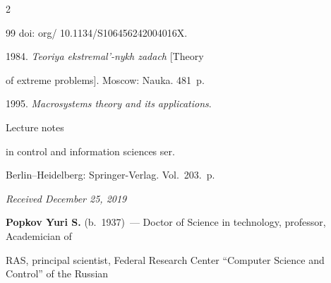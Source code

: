 \begin{multicols}{2}
{{\begin{thebibliography}{99}
 doi: org/ 10.1134/S106456242004016X.




 1984. \textit{Teoriya eks\-tre\-mal'-nykh zadach} [Theory 


of extreme problems]. Moscow: Nauka. 481~p.




 1995. \textit{Macrosystems theory and its applications}.


Lecture notes 


in control and information sciences ser.


 Berlin--Heidelberg: Springer-Verlag. Vol.~203.~p.


 


 


\end{thebibliography}





 }


 }





\end{multicols}





\vspace*{-3pt}





\hfill{\small\textit{Received December 25, 2019}}


















\Contr





\noindent


\textbf{Popkov Yuri S.} (b.\ 1937)~--- Doctor of Science in technology, professor, Academician of 


RAS, principal scientist, Federal Research Center ``Computer Science and Control'' of the Russian 


